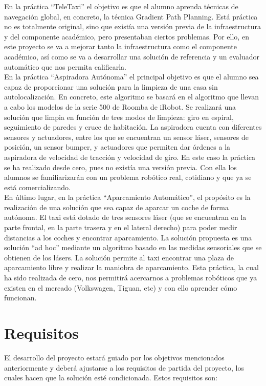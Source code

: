En la práctica ``TeleTaxi'' el objetivo es que el alumno aprenda técnicas de navegación global, en concreto, la técnica Gradient Path Planning. Está práctica no es totalmente original, sino que existía una versión previa de la infraestructura y del componente académico, pero presentaban ciertos problemas. Por ello, en este proyecto se va a mejorar tanto la infraestructura como el componente académico, así como se va a desarrollar una solución de referencia y un evaluador automático que nos permita calificarla.\\

En la práctica ``Aspiradora Autónoma'' el principal objetivo es que el alumno sea capaz de proporcionar una solución para la limpieza de una casa sin autolocalización. En concreto, este algoritmo se basará en el algoritmo que llevan a cabo los modelos de la serie 500 de Roomba de iRobot. Se realizará una solución que limpia en función de tres modos de limpieza: giro en espiral, seguimiento de paredes y cruce de habitación. La aspiradora cuenta con diferentes sensores y actuadores, entre los que se encuentran un sensor láser, sensores de posición, un sensor bumper, y actuadores que permiten dar órdenes a la aspiradora de velocidad de tracción y velocidad de giro.  En este caso la práctica se ha realizado desde cero, pues no existía una versión previa. Con ella los alumnos se familiarizarán con un problema robótico real, cotidiano y que ya se está comercializando.\\


En último lugar, en la práctica ``Aparcamiento Automático'', el propósito es la realización de una solución que sea capaz de aparcar un coche de forma autónoma. El taxi está dotado de tres sensores láser (que se encuentran en la parte frontal, en la parte trasera y en el lateral derecho) para poder medir distancias a los coches y encontrar aparcamiento. La solución propuesta es una solución ``ad hoc'' mediante un algoritmo basado en las medidas sensoriales que se obtienen de los lásers. La solución permite al taxi encontrar una plaza de aparcamiento libre y realizar la maniobra de aparcamiento. Esta práctica, la cual ha sido realizada de cero, nos permitirá acercarnos a problemas robóticos que ya existen en el mercado (Volkswagen, Tiguan, etc) y con ello aprender cómo funcionan.

\section{Requisitos}
El desarrollo del proyecto estará guiado por los objetivos mencionados anteriormente y deberá ajustarse a los requisitos de partida del proyecto, los cuales hacen que la solución esté condicionada. Estos requisitos son:

